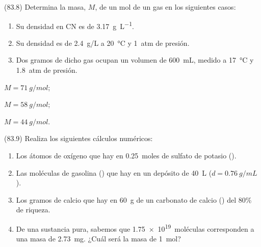       \begin{exercise}[
          tags    = {},
          topics  = {química,química básica},
          source  = {FQ 1B MGH 2016, p83, e8},
        ]
        (83.8) Determina la masa, \( M \), de un mol de un gas en los siguientes
        casos:
        \begin{enumerate}
          \item Su densidad en CN es de \SI{3.17}{\gram\per\liter}.
          \item Su densidad es de \SI{2.4}{g/L} a \SI{20}{\celsius} y \SI{1}{atm} de presión.
          \item Dos gramos de dicho gas ocupan un volumen de \SI{600}{\milli\liter}, medido a \SI{17}{\celsius} y \SI{1.8}{atm} de presión.
        \end{enumerate}
      \end{exercise}

      \begin{solution}
        \begin{enumerate*}
          \item \( M = \SI{71}{g/mol} \);
          \item \( M = \SI{58}{g/mol} \);
          \item \( M = \SI{44}{g/mol} \).
          \end{enumerate*}
      \end{solution}




      \begin{exercise}[
          tags    = {},
          topics  = {química,química básica},
          source  = {FQ 1B MGH 2016, p83, e9},
        ]
        (83.9) Realiza los siguientes cálculos numéricos:
        \begin{enumerate}
          \item Los átomos de oxígeno que hay en \SI{0.25}{moles} de sulfato de potasio ().
          \item Las moléculas de gasolina () que hay en un depósito de \SI{40}{\liter} (\( d = \SI{0.76}{g/mL} \)).
          \item Los gramos de calcio que hay en \SI{60}{g} de un carbonato de calcio () del 80\% de riqueza.
          \item De una sustancia pura, sabemos que \SI{1.75e19}{moléculas} corresponden a una masa de \SI{2.73}{mg}. ¿Cuál será la masa de \SI{1}{mol}?
        \end{enumerate}
      \end{exercise}

